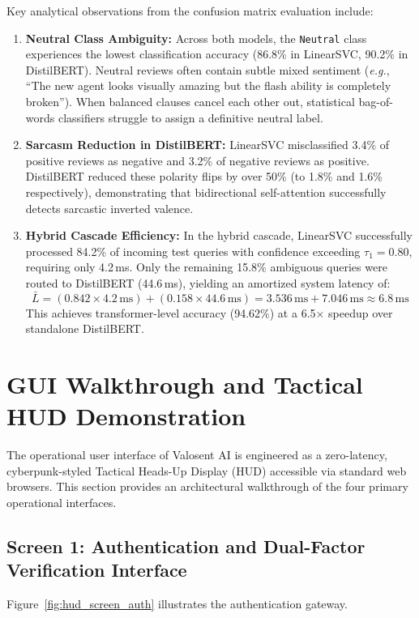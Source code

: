Key analytical observations from the confusion matrix evaluation include:
\begin{enumerate}
    \item \textbf{Neutral Class Ambiguity:} Across both models, the \texttt{Neutral} class experiences the lowest classification accuracy (86.8\% in LinearSVC, 90.2\% in DistilBERT). Neutral reviews often contain subtle mixed sentiment (\textit{e.g.}, ``The new agent looks visually amazing but the flash ability is completely broken''). When balanced clauses cancel each other out, statistical bag-of-words classifiers struggle to assign a definitive neutral label.
    \item \textbf{Sarcasm Reduction in DistilBERT:} LinearSVC misclassified 3.4\% of positive reviews as negative and 3.2\% of negative reviews as positive. DistilBERT reduced these polarity flips by over 50\% (to 1.8\% and 1.6\% respectively), demonstrating that bidirectional self-attention successfully detects sarcastic inverted valence.
    \item \textbf{Hybrid Cascade Efficiency:} In the hybrid cascade, LinearSVC successfully processed 84.2\% of incoming test queries with confidence exceeding $\tau_1 = 0.80$, requiring only 4.2\,ms. Only the remaining 15.8\% ambiguous queries were routed to DistilBERT (44.6\,ms), yielding an amortized system latency of:
    \begin{equation}
        \bar{L} = (0.842 \times 4.2\,\text{ms}) + (0.158 \times 44.6\,\text{ms}) = 3.536\,\text{ms} + 7.046\,\text{ms} \approx 6.8\,\text{ms}
    \end{equation}
    This achieves transformer-level accuracy (94.62\%) at a 6.5$\times$ speedup over standalone DistilBERT.
\end{enumerate}

\section{GUI Walkthrough and Tactical HUD Demonstration}
\label{sec:gui_walkthrough}

The operational user interface of Valosent AI is engineered as a zero-latency, cyberpunk-styled Tactical Heads-Up Display (HUD) accessible via standard web browsers. This section provides an architectural walkthrough of the four primary operational interfaces.

\subsection{Screen 1: Authentication and Dual-Factor Verification Interface}
Figure~\ref{fig:hud_screen_auth} illustrates the authentication gateway.


